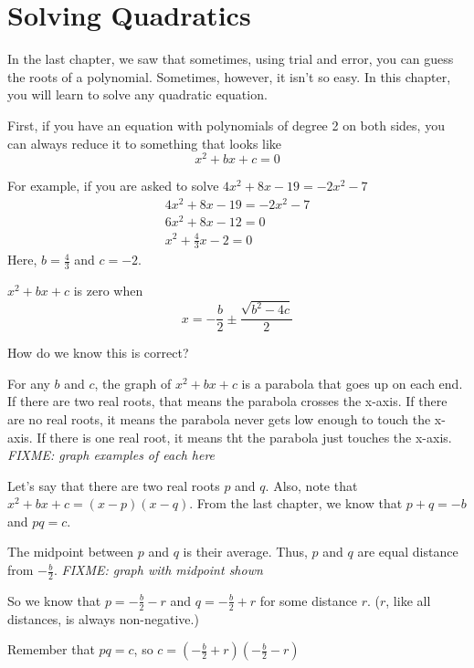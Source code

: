 \chapter{Solving Quadratics}

In the last chapter, we saw that sometimes, using trial and error, you
can guess the roots of a polynomial. Sometimes, however, it isn't so
easy. In this chapter, you will learn to solve any quadratic equation.

First, if you have an equation with polynomials of degree 2 on both
sides, you can always reduce it to something that looks like
\begin{equation*}
  x^2 + bx + c = 0
\end{equation*}

For example, if you are asked to solve $4x^2 + 8x - 19 = -2x^2 - 7$
\begin{multline*}
  4x^2 + 8x - 19 = -2x^2 - 7 \\
  6x^2 + 8x -12 = 0 \\
  x^2 + \frac{4}{3}x - 2 = 0
\end{multline*}
Here, $b = \frac{4}{3}$ and $c = -2$.

$x^2 + bx + c$ is zero when
\begin{equation*}
x = -\frac{b}{2} \pm \frac{\sqrt{b^2 - 4c}}{2}  
\end{equation*}

How do we know this is correct?

For any $b$ and $c$, the graph of $x^2 + bx + c$ is a parabola
that goes up on each end. If there are two real roots, that means the
parabola crosses the x-axis. If there are no real roots, it means the
parabola never gets low enough to touch the x-axis. If there is one
real root, it means tht the parabola just touches the x-axis.
\emph{FIXME: graph examples of each here}

Let's say that there are two real roots $p$ and $q$. Also, note that $x^2 + bx + c = (x - p)(x - q)$.
From the last chapter, we know that $p + q = -b$ and $pq = c$.

The midpoint between $p$ and $q$ is their average. Thus, $p$ and $q$ are equal distance from $-\frac{b}{2}$.
\emph{FIXME: graph with midpoint shown}

So we know that $p = -\frac{b}{2} - r$ and $q = -\frac{b}{2} + r$ for some distance $r$. ($r$, like all distances, is always non-negative.)

Remember that $pq = c$, so $c = \left(-\frac{b}{2} + r \right)\left(-\frac{b}{2} - r\right)$

